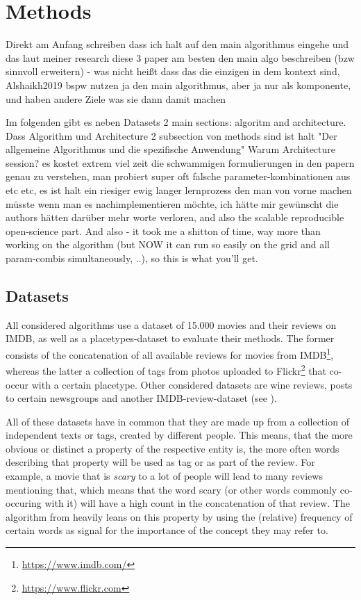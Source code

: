 \chapter{Methods}

Direkt am Anfang schreiben dass ich halt auf den main algorithmus eingehe und das laut meiner research diese 3 paper am besten den main algo beschreiben (bzw sinnvoll erweitern) - was nicht heißt dass das die einzigen in dem kontext sind, Alshaikh2019 bspw nutzen ja den main algorithmus, aber ja nur als komponente, und haben andere Ziele was sie dann damit machen

Im folgenden gibt es neben Datasets 2 main sections: algoritm and architecture. Dass Algorithm und Architecture 2 subsection von methods sind ist halt "Der allgemeine Algorithmus und die spezifische Anwendung" Warum Architecture session? es kostet extrem viel zeit die schwammigen formulierungen in den papern genau zu verstehen, man probiert super oft falsche parameter-kombinationen aus etc etc, es ist halt ein riesiger ewig langer lernprozess den man von vorne machen müsste wenn man es nachimplementieren möchte, ich hätte mir gewünscht die authors hätten darüber mehr worte verloren, and also the scalable reproducible open-science part. And also - it took me a shitton of time, way more than working on the algorithm (but NOW it can run so easily on the grid and all param-combis simultaneously, ..), so this is what you'll get.


\section{Datasets}

All considered algorithms \mainalgos use a dataset of 15.000 movies and their reviews on IMDB, as well as a placetypes-dataset to evaluate their methods. The former consists of the concatenation of all available reviews for movies from IMDB\footnote{\url{https://www.imdb.com/}}, whereas the latter a collection of tags from photos uploaded to Flickr\footnote{\url{https://www.flickr.com}} that co-occur with a certain placetype. Other considered datasets are wine reviews, posts to certain newsgroups and another IMDB-review-dataset (see ). 

All of these datasets have in common that they are made up from a collection of independent texts or tags, created by different people. This means, that the more obvious or distinct a property of the respective entity is, the more often words describing that property will be used as tag or as part of the review. For example, a movie that is \emph{scary} to a lot of people will lead to many reviews mentioning that, which means that the word scary (or other words commonly co-occuring with it) will have a high count in the concatenation of that review. The algorithm from \cite{Derrac2015} heavily leans on this property by using the (relative) frequency of certain words as signal for the importance of the concept they may refer to. 

